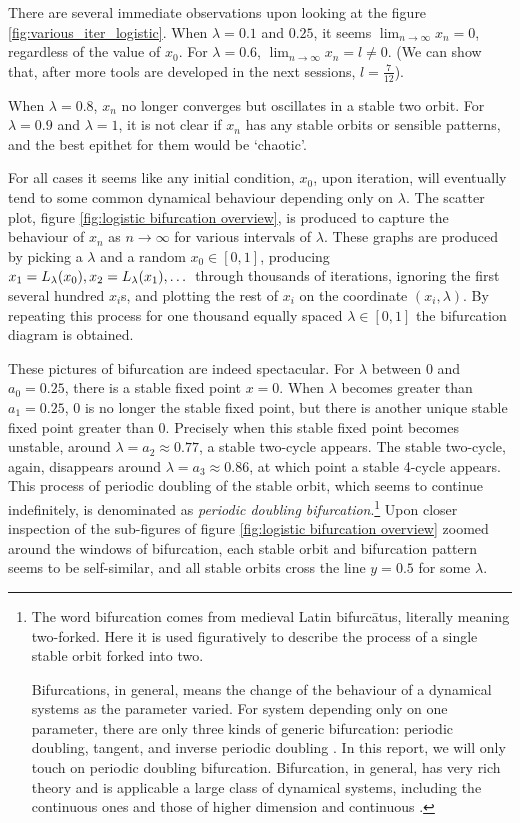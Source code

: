 There are several immediate observations upon looking at the figure \ref{fig:various_iter_logistic}.
When $\lambda = 0.1$ and $0.25$, it seems $\lim_{n \rightarrow \infty} x_n = 0$, regardless of the value of $x_0$.
For $\lambda = 0.6$, $\lim_{n \rightarrow \infty} x_n = l \neq 0$. 
(We can show that, after more tools are developed in the next sessions, $l = \frac{7}{12}$). 

When $\lambda = 0.8$, $x_n$ no longer converges but oscillates in a stable two orbit. 
For $\lambda = 0.9$ and $\lambda = 1$, it is not clear if $x_n$ has any stable orbits or sensible patterns, and the best epithet for them would be `chaotic'.

For all cases it seems like any initial condition, $x_0$, upon iteration, will eventually tend to some common dynamical behaviour depending only on $\lambda$.
The scatter plot, figure \ref{fig:logistic bifurcation overview}, is produced to capture the behaviour of $x_n$ as $n \rightarrow \infty$ for various intervals of $\lambda$.
These graphs are produced by picking a $\lambda$ and a random $x_0 \in [0,1]$, producing $x_{1} = L_{\lambda}(x_0), x_{2} = L_{\lambda}(x_1), \dots$ through thousands of iterations, ignoring the first several hundred $x_i$s, and plotting the rest of $x_i$ on the coordinate $(x_i, \lambda)$. 
By repeating this process for one thousand equally spaced $\lambda \in [0,1]$ the bifurcation diagram is obtained.

These pictures of bifurcation are indeed spectacular. 
For $\lambda$ between $0$ and $a_0 = 0.25$, there is a stable fixed point $x = 0$.
When $\lambda$ becomes greater than $a_1 = 0.25$, $0$ is no longer the stable fixed point, but there is another unique stable fixed point greater than $0$.
Precisely when this stable fixed point becomes unstable, around $\lambda = a_2 \approx 0.77$, a stable two-cycle appears.
The stable two-cycle, again, disappears around $\lambda = a_3 \approx 0.86$, at which point a stable 4-cycle appears. 
This process of periodic doubling of the stable orbit, which seems to continue indefinitely, is denominated as \emph{periodic doubling bifurcation}.\footnote{
	The word bifurcation comes from medieval Latin bifurcātus, literally meaning two-forked.
	Here it is used figuratively to describe the process of a single stable orbit forked into two.
	
	Bifurcations, in general, means the change of the behaviour of a dynamical systems as the parameter varied.
	For system depending only on one parameter, there are only three kinds of generic bifurcation: periodic doubling, tangent, and inverse periodic doubling \cite{Chaos_in_DS}.
	In this report, we will only touch on periodic doubling bifurcation.
	Bifurcation, in general, has very rich theory and is applicable a large class of dynamical systems, including the continuous ones and those of higher dimension and continuous  \cite{dynamical_systems_v}.
}
Upon closer inspection of the sub-figures of figure \ref{fig:logistic bifurcation overview} zoomed around the windows of bifurcation, each stable orbit and bifurcation pattern seems to be self-similar, and all stable orbits cross the line $y = 0.5$ for some $\lambda$.

